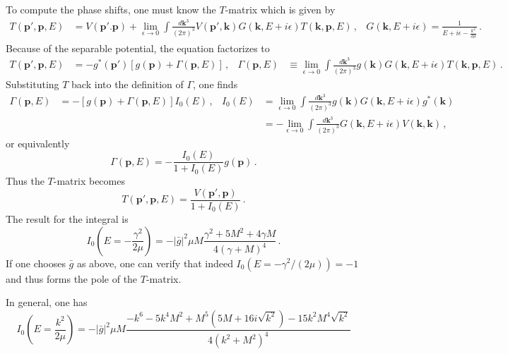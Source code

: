 \documentclass[
    aps,
    prl,
    showkeys,
    nofootinbib,
    floatfix
]{revtex4-1}
\renewcommand{\vec}[1]{\boldsymbol{#1}}
\begin{document}
To compute the phase shifts, one must know the $T$-matrix which is given by
\begin{align}
	T(\vec p', \vec p, E)
	&=
	V(\vec p'. \vec p) + \lim\limits_{\epsilon \to 0}\int \frac{d \vec k^3}{(2\pi)^3} V(\vec p', \vec k) G(\vec k, E + i \epsilon) T(\vec k, \vec p, E) \, ,
	&
	G(\vec k, E+ i \epsilon) = \frac{1}{E + i \epsilon - \frac{k^2}{2\mu}}
	\, .
\end{align}
Because of the separable potential, the equation factorizes to
\begin{align}
	T(\vec p', \vec p, E)
	&=
	- g^*(\vec p') \left[ g(\vec p) + \Gamma(\vec p, E) \right] \, ,
	&
	\Gamma(\vec p, E)
	&\equiv
	\lim\limits_{\epsilon \to 0}\int \frac{d \vec k^3}{(2\pi)^3} g(\vec k) G(\vec k, E + i \epsilon) T(\vec k, \vec p, E)
	\, .
\end{align}
Substituting $T$ back into the definition of $\Gamma$, one finds
\begin{align}
	\Gamma(\vec p, E)
	&= - \left[ g(\vec p) + \Gamma(\vec p, E) \right] I_0(E)
	\, , &
	I_0(E) &= \lim\limits_{\epsilon \to 0}\int \frac{d \vec k^3}{(2\pi)^3} g(\vec k) G(\vec k, E + i \epsilon) g^*(\vec k) 
	\\&&&= - \lim\limits_{\epsilon \to 0}\int \frac{d \vec k^3}{(2\pi)^3}  G(\vec k, E + i \epsilon) V(\vec k, \vec k)
	\, ,
\end{align}
or equivalently
\begin{equation}
	\Gamma(\vec p, E) = - \frac{I_0(E)}{1 + I_0(E)}g(\vec p) \, .
\end{equation}
Thus the $T$-matrix becomes
\begin{equation}
	T(\vec p', \vec p, E)
	=
	\frac{V(\vec p', \vec p)}{1 + I_0(E)}
	\, .
\end{equation}
The result for the integral is
\begin{equation}
	I_0\left(E = - \frac{\gamma^2}{2\mu}\right)
	=
	- |\bar g|^2 \mu  M \frac{\gamma ^2+5 M^2+4 \gamma  M}{4(\gamma +M)^4}
	\, .
\end{equation}
If one chooses $\bar g$ as above, one can verify that indeed $I_0(E = - \gamma^2/(2\mu)) = -1$ and thus forms the pole of the $T$-matrix.

In general, one has
\begin{equation}
	I_0\left(E = \frac{k^2}{2\mu}\right)
	=
	-|\bar g|^2 \mu  M \frac{
		-k^6-5 k^4 M^2+M^5 \left(5 M+16 i \sqrt{k^2}\right)-15 k^2 M^4 \sqrt{k^2}
	}{
		4\left(k^2+M^2\right)^4
	}
\end{equation}
\end{document}
